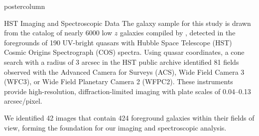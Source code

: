 \documentclass{beamer}
\begin{document}
\begin{frame}
\begin{columns}[c]
  \end{columns}
  \vspace{0.5cm}
  \begin{columns}[T]
    \begin{column}{0.48\textwidth}
      \begin{beamercolorbox}[center,wd=\textwidth]{postercolumn}
        \begin{block}{HST Imaging and Spectroscopic Data} 
            The galaxy sample for this study is drawn from the catalog of nearly 6000 low $z$ galaxies compiled by \cite{dutta2023musequbes}, detected in the foregrounds of 190 UV-bright quasars with Hubble Space Telescope (HST) Cosmic Origins Spectrograph (COS) spectra. Using quasar coordinates, a cone search with a radius of 3 arcsec in the HST public archive identified 81 fields observed with the Advanced Camera for Surveys (ACS), Wide Field Camera 3 (WFC3), or Wide Field Planetary Camera 2 (WFPC2). These instruments provide high-resolution, diffraction-limited imaging with plate scales of 0.04–0.13 arcsec/pixel.
            
           We identified 42 images that contain 424 foreground galaxies within their fields of view, forming the foundation for our imaging and spectroscopic analysis.



\end{block}
\end{beamercolorbox}
\end{column}
\end{columns}
\end{frame}
\end{document}
